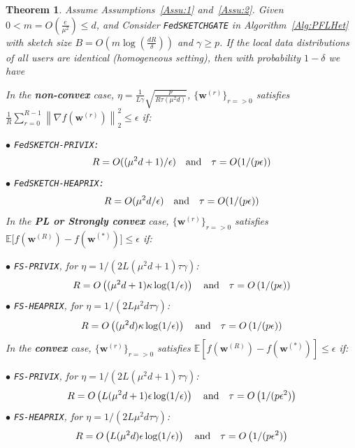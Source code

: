 \documentclass[twoside]{article}
\newtheorem{theorem}{Theorem}
\begin{document}
\begin{theorem}\label{thm:hetreg_case}
Assume Assumptions~\ref{Assu:1} and~\ref{Assu:2}. Given $0<m=O\left(\frac{e}{\mu^2}\right)\leq d$, and Consider \texttt{FedSKETCHGATE} in Algorithm~\ref{Alg:PFLHet} with sketch size $B=O\left(m\log\left(\frac{d R}{\delta}\right)\right)$ and $\gamma\geq p$. 
If the local data distributions of all users are identical (homogeneous setting), then with probability $1-\delta$ we have  



In the \textbf{non-convex} case, $\eta=\frac{1}{L\gamma}\sqrt{\frac{p}{R\tau\left(\mu^2d\right)}}$, $\{ {\boldsymbol{w}}^{(r)}\}_{r=>0}$ satisfies  $\frac{1}{R}\sum_{r=0}^{R-1}\left\|\nabla f({\boldsymbol{w}}^{(r)})\right\|_2^2\leq {\epsilon}$ if: 
 
\noindent $\bullet$ \texttt{FedSKETCH-PRIVIX:}    
\begin{equation}\notag
R=O((\mu^2d+1)/\epsilon) \quad \textrm{and} \quad \tau=O(1/(p\epsilon))
 \end{equation}
\noindent $\bullet$ \texttt{FedSKETCH-HEAPRIX:} 
\begin{equation}\notag
R=O(\mu^2d/\epsilon) \quad \textrm{and} \quad \tau=O(1/(p\epsilon))
 \end{equation}
In the \textbf{PL or Strongly convex} case, $\{ {\boldsymbol{w}}^{(r)}\}_{r=>0}$ satisfies $\mathbb{E}\Big[f({\boldsymbol{w}}^{(R)})-f({\boldsymbol{w}}^{(*)})\Big]\leq \epsilon$ if: 

\noindent $\bullet$ \texttt{FS-PRIVIX}, for $\eta=1/(2L(\mu^2d+1)\tau\gamma)$:    
\begin{equation}\notag
R=O\left((\mu^2d+1)\kappa \log(1/\epsilon)\right) \quad \textrm{and} \quad \tau=O\left(1/(p\epsilon)\right)
 \end{equation}
\noindent $\bullet$ \texttt{FS-HEAPRIX}, for $\eta=1/(2L\mu^2d\tau\gamma)$:
\begin{equation}\notag
R=O\left((\mu^2d)\kappa \log(1/\epsilon)\right) \quad \textrm{and} \quad \tau=O\left(1/(p\epsilon)\right)
 \end{equation}
 In the \textbf{convex} case, $\{ {\boldsymbol{w}}^{(r)}\}_{r=>0}$ satisfies $ \mathbb{E}[f({\boldsymbol{w}}^{(R)})-f({\boldsymbol{w}}^{(*)})]\leq \epsilon$ if: 
 
\noindent $\bullet$ \texttt{FS-PRIVIX}, for $\eta=1/(2L(\mu^2d+1)\tau\gamma)$: 
\begin{equation}\notag
R=O\left(L(\mu^2d+1)\epsilon \log(1/\epsilon)\right) \quad \textrm{and} \quad \tau=O\left(1/(p\epsilon^2)\right)
 \end{equation}
\noindent $\bullet$ \texttt{FS-HEAPRIX}, for $\eta=1/(2L\mu^2d\tau\gamma)$:
\begin{equation}\notag
R=O\left(L(\mu^2d)\epsilon \log(1/\epsilon)\right) \quad \textrm{and} \quad \tau=O\left(1/(p\epsilon^2)\right)
 \end{equation}
 \end{theorem}
\end{document}
